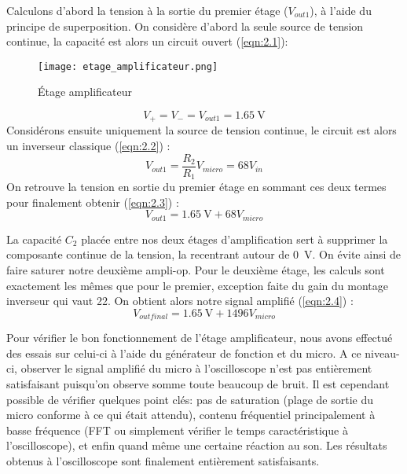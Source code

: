 Calculons d'abord la tension à la sortie du premier étage ($V_{out 1}$), à l'aide du principe de superposition. On considère d'abord la seule source de tension continue, la capacité est alors un circuit ouvert (\ref{eqn:2.1}):
\begin{figure}[htbp]
\centering
\texttt{[image: etage\_amplificateur.png]}
\caption{Étage amplificateur}
\label{fig:etage amplificateur}
\end{figure}
\begin{equation}
V_{+} = V_{-} = V_{out 1} = \SI{1.65}{\volt}
\label{eqn:2.1}
\end{equation}
Considérons ensuite uniquement la source de tension continue, le circuit est alors un inverseur classique (\ref{eqn:2.2}) :
\begin{equation}
V_{out 1} = \frac{R_2}{R_1} V_{micro} = 68 V_{in}
\label{eqn:2.2}
\end{equation}
On retrouve la tension en sortie du premier étage en sommant ces deux termes pour finalement obtenir (\ref{eqn:2.3}) :
\begin{equation}
V_{out 1} = \SI{1.65}{\volt} + 68 V_{micro}
\label{eqn:2.3}
\end{equation}

La capacité $C_{2}$ placée entre nos deux étages d'amplification sert à supprimer la composante continue de la tension, la recentrant autour de \SI{0}{\volt}. On évite ainsi de faire saturer notre deuxième ampli-op. Pour le deuxième étage, les calculs sont exactement les mêmes que pour le premier, exception faite du gain du montage inverseur qui vaut 22. On obtient alors notre signal amplifié (\ref{eqn:2.4}) :
\begin{equation}
V_{out final} = \SI{1.65}{\volt} + 1496 V_{micro}
\label{eqn:2.4}
\end{equation}

Pour vérifier le bon fonctionnement de l'étage amplificateur, nous avons effectué des essais sur celui-ci à l'aide du générateur de fonction et du micro. A ce niveau-ci, observer le signal amplifié du micro à l'oscilloscope n'est pas entièrement satisfaisant puisqu'on observe somme toute beaucoup de bruit. Il est cependant possible de vérifier quelques point clés: pas de saturation (plage de sortie du micro conforme à ce qui était attendu), contenu fréquentiel principalement à basse fréquence (FFT ou simplement vérifier le temps caractéristique à l'oscilloscope), et enfin quand même une certaine réaction au son. Les résultats obtenus à l'oscilloscope sont finalement entièrement satisfaisants.

